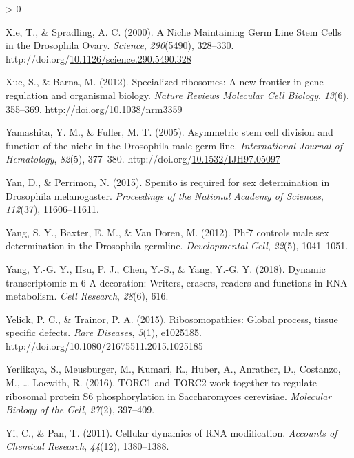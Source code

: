 \documentclass[12pt,oneside]{reedthesis}
\newlength{\cslhangindent}
\newenvironment{CSLReferences}[2] %
 {%
  \setlength{\parindent}{0pt}
  \ifodd #1 \everypar{\setlength{\hangindent}{\cslhangindent}}\ignorespaces\fi
  \ifnum #2 > 0
  \setlength{\parskip}{#2\baselineskip}
  \fi
 }%
 {}
\begin{document}
\begin{CSLReferences}{1}{0}
\leavevmode\hypertarget{ref-Xie2000b}{}%
Xie, T., \& Spradling, A. C. (2000). A {Niche Maintaining Germ Line Stem Cells} in the {Drosophila Ovary}. \emph{Science}, \emph{290}(5490), 328--330. http://doi.org/\href{https://doi.org/10.1126/science.290.5490.328}{10.1126/science.290.5490.328}

\leavevmode\hypertarget{ref-Xue2012}{}%
Xue, S., \& Barna, M. (2012). Specialized ribosomes: A new frontier in gene regulation and organismal biology. \emph{Nature Reviews Molecular Cell Biology}, \emph{13}(6), 355--369. http://doi.org/\href{https://doi.org/10.1038/nrm3359}{10.1038/nrm3359}

\leavevmode\hypertarget{ref-Yamashita2005d}{}%
Yamashita, Y. M., \& Fuller, M. T. (2005). Asymmetric stem cell division and function of the niche in the {Drosophila} male germ line. \emph{International Journal of Hematology}, \emph{82}(5), 377--380. http://doi.org/\href{https://doi.org/10.1532/IJH97.05097}{10.1532/IJH97.05097}

\leavevmode\hypertarget{ref-Yan2015}{}%
Yan, D., \& Perrimon, N. (2015). Spenito is required for sex determination in {Drosophila} melanogaster. \emph{Proceedings of the National Academy of Sciences}, \emph{112}(37), 11606--11611.

\leavevmode\hypertarget{ref-Yang2012}{}%
Yang, S. Y., Baxter, E. M., \& Van Doren, M. (2012). Phf7 controls male sex determination in the {Drosophila} germline. \emph{Developmental Cell}, \emph{22}(5), 1041--1051.

\leavevmode\hypertarget{ref-Yang2018}{}%
Yang, Y.-G. Y., Hsu, P. J., Chen, Y.-S., \& Yang, Y.-G. Y. (2018). Dynamic transcriptomic m 6 {A} decoration: Writers, erasers, readers and functions in {RNA} metabolism. \emph{Cell Research}, \emph{28}(6), 616.

\leavevmode\hypertarget{ref-Yelick2015a}{}%
Yelick, P. C., \& Trainor, P. A. (2015). Ribosomopathies: {Global} process, tissue specific defects. \emph{Rare Diseases}, \emph{3}(1), e1025185. http://doi.org/\href{https://doi.org/10.1080/21675511.2015.1025185}{10.1080/21675511.2015.1025185}

\leavevmode\hypertarget{ref-Yerlikaya2016a}{}%
Yerlikaya, S., Meusburger, M., Kumari, R., Huber, A., Anrather, D., Costanzo, M., \ldots{} Loewith, R. (2016). {TORC1} and {TORC2} work together to regulate ribosomal protein {S6} phosphorylation in {Saccharomyces} cerevisiae. \emph{Molecular Biology of the Cell}, \emph{27}(2), 397--409.

\leavevmode\hypertarget{ref-Yi2011}{}%
Yi, C., \& Pan, T. (2011). Cellular dynamics of {RNA} modification. \emph{Accounts of Chemical Research}, \emph{44}(12), 1380--1388.


\end{CSLReferences}
\end{document}
